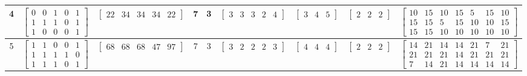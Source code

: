 \documentclass[11pt]{article}
\begin{document}
\begin{xltabular}{\textwidth}{|c|c|c|c|c|c|c|c|c|}
4 &
$\begin{bmatrix}
  0  &  0  &  1  &  0  &  1 \\
  1  &  1  &  1  &  0  &  1 \\
  1  &  0  &  0  &  0  &  1
\end{bmatrix}$ &
$\begin{bmatrix}
  22  &  34  &  34  &  34  &  22
\end{bmatrix}$ &
7 &
3 &
$\begin{bmatrix}
  3  &  3  &  3  &  2  &  4
\end{bmatrix}$ &
$\begin{bmatrix}
  3  &  4  &  5
\end{bmatrix}$ &
$\begin{bmatrix}
  2  &  2  &  2
\end{bmatrix}$ &
$\begin{bmatrix}
  10  &  15  &  10  &  15  &  5  &  15  &  10 \\
  15  &  15  &  5  &  15  &  10  &  10  &  15 \\
  15  &  15  &  10  &  10  &  10  &  10  &  10
\end{bmatrix}$ \\
\hline

5 &
$\begin{bmatrix}
  1  &  1  &  0  &  0  &  1 \\
  1  &  1  &  1  &  1  &  0 \\
  1  &  1  &  1  &  0  &  1
\end{bmatrix}$ &
$\begin{bmatrix}
  68  &  68  &  68  &  47  &  97
\end{bmatrix}$ &
7 &
3 &
$\begin{bmatrix}
  3  &  2  &  2  &  2  &  3
\end{bmatrix}$ &
$\begin{bmatrix}
  4  &  4  &  4
\end{bmatrix}$ &
$\begin{bmatrix}
  2  &  2  &  2
\end{bmatrix}$ &
$\begin{bmatrix}
  14  &  21  &  14  &  14  &  21  &  7  &  21 \\
  21  &  21  &  21  &  14  &  21  &  21  &  21 \\
  7  &  14  &  21  &  14  &  14  &  14  &  14
\end{bmatrix}$ \\
\hline


\end{xltabular}
\end{document}
